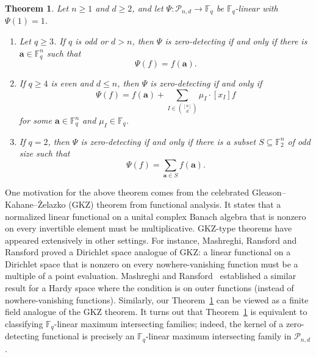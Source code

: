 \documentclass[12pt,reqno]{amsart}
\newtheorem{thm}{Theorem}[section]
\theoremstyle{definition}
\newcommand{\F}{\mathbb{F}}
\newcommand{\cP}{\mathcal P}
\begin{document}
\begin{thm}\label{thm:zero-detecting}
Let $n\geq1$ and $d\geq2$, and let
$\Psi\colon \cP_{n,d}\to \F_q$ be $\F_q$-linear with $\Psi(1)=1$.
\begin{enumerate}[(1)]
\item Let $q\geq 3$. If $q$ is odd or $d>n$, then $\Psi$ is zero-detecting if and only if there is $\mathbf a\in \F_q^n$ such that
\[
  \Psi(f)=f(\mathbf a).
\]
\item If $q\geq 4$ is even and $d\leq n$, then $\Psi$ is zero-detecting
if and only if
\[
  \Psi(f)
  =f(\mathbf a)
   +\sum_{I\in\binom{[n]}{d}}\mu_I \cdot [x_I]f
\]
for some $\mathbf a\in \F_q^n$ and
$\mu_I\in \F_q$.

\item If $q=2$, then $\Psi$ is zero-detecting if and only if there is a subset $S\subseteq\F_2^n$ of odd size such that
\[
  \Psi(f)=\sum_{\mathbf a\in S}f(\mathbf a).
\]
\end{enumerate}
\end{thm}

One motivation for the above theorem comes from the celebrated Gleason--Kahane--\.{Z}elazko (GKZ) theorem \cite{Gle67, KZ68} from functional analysis. It states that a normalized linear functional on a unital complex Banach algebra that is nonzero on every invertible element must be multiplicative. GKZ-type theorems have appeared extensively in other settings. For instance, Mashreghi, Ransford and Ransford \cite{MRR18} proved a Dirichlet space analogue of GKZ: a linear functional on a Dirichlet space that is nonzero on every nowhere-vanishing function must be a multiple of a point evaluation. Mashreghi and Ransford~\cite{MR15} established a similar result for a Hardy space where the condition is on outer functions (instead of nowhere-vanishing functions). Similarly, our Theorem~\ref{thm:zero-detecting} can be viewed as a finite field analogue of the GKZ theorem. It turns out that Theorem~\ref{thm:zero-detecting} is equivalent to classifying $\F_q$-linear maximum intersecting families; indeed, the kernel of a zero-detecting functional is precisely an $\F_q$-linear maximum intersecting family in $\cP_{n,d}$.

\medskip
\end{document}
